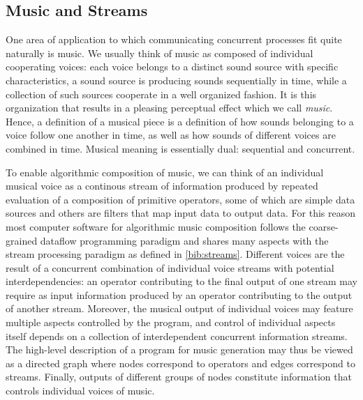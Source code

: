 \documentclass {article}
\begin{document}
\subsection{Music and Streams}

One area of application to which communicating concurrent processes fit quite naturally is music. We usually think of music as composed of individual cooperating voices: each voice belongs to a distinct sound source with specific characteristics, a sound source is producing sounds sequentially in time, while a collection of such sources cooperate in a well organized fashion. It is this organization that results in a pleasing perceptual effect which we call \emph{music}. Hence, a definition of a musical piece is a definition of how sounds belonging to a voice follow one another in time, as well as how sounds of different voices are combined in time. Musical meaning is essentially dual: sequential and concurrent.

To enable algorithmic composition of music, we can think of an individual musical voice as a continous stream of information produced by repeated evaluation of a composition of primitive operators, some of which are simple data sources and others are filters that map input data to output data. For this reason most computer software for algorithmic music composition follows the coarse-grained dataflow programming paradigm and shares many aspects with the stream processing paradigm as defined in \ref{bib:streams}. Different voices are the result of a concurrent combination of individual voice streams with potential interdependencies: an operator contributing to the final output of one stream may require as input information produced by an operator contributing to the output of another stream. Moreover, the musical output of individual voices may feature multiple aspects controlled by the program, and control of individual aspects itself depends on a collection of interdependent concurrent information streams. The high-level description of a program for music generation may thus be viewed as a directed graph where nodes correspond to operators and edges correspond to streams. Finally, outputs of different groups of nodes constitute information that controls individual voices of music.
\end{document}
